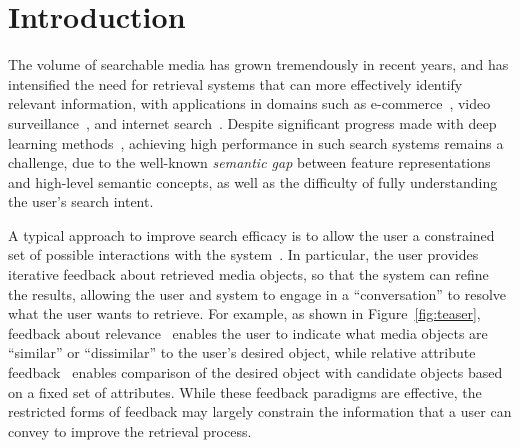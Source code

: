 \section{Introduction}

The volume of searchable media has grown tremendously in recent years, and has intensified the need for retrieval systems that can more effectively identify relevant information, with applications in domains such as e-commerce~\cite{huang2015cross,liuLQWTcvpr16DeepFashion}, video surveillance~\cite{vaquero2009attribute,shi2015transferring}, and internet search~\cite{gordo2016deep,jegou2012aggregating}. Despite significant progress made %
with deep learning methods~\cite{krizhevsky2012imagenet,wang2014learning,gordo2017end}, achieving high performance in such %
search systems remains a challenge, due to the well-known {\em semantic gap} between feature representations and high-level semantic concepts, as well as the difficulty of fully understanding the user's search intent. 

A typical approach to improve search efficacy is to 
allow the user a constrained set of possible interactions with the system~\cite{zhou2003relevance,thomee2012interactive}. 
In particular, the user provides iterative feedback about retrieved media objects, so that the system can refine the results, 
allowing the user and system to engage in a ``conversation'' 
to resolve what the user wants to retrieve.
For example, as shown in Figure~\ref{fig:teaser},
feedback about relevance~\cite{rui1998relevance}
enables the user to indicate what media objects are ``similar'' or ``dissimilar'' to the user's 
desired object, while relative attribute feedback~\cite{kovashka2012} enables comparison of the desired object with candidate objects based on a fixed set of attributes. 
While these feedback paradigms are effective, the restricted forms of feedback may largely constrain the information that a user can convey to improve the retrieval process.

